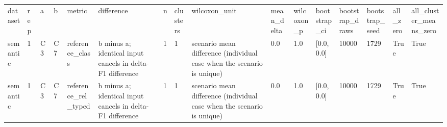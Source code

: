 \begin{tabular}{llllllllllllllll}
dataset & rep & a & b & metric & difference & n & clusters & wilcoxon\_unit & mean\_delta & wilcoxon\_p & bootstrap\_ci & bootstrap\_draws & bootstrap\_seed & all\_zero & all\_cluster\_means\_zero \\
semantic & 1 & C3 & C7 & reference\_class & b minus a; identical input cancels in delta-F1 difference & 1 & 1 & scenario mean difference (individual case when the scenario is unique) & 0.0 & 1.0 & [0.0, 0.0] & 10000 & 1729 & True & True \\
semantic & 1 & C3 & C7 & reference\_rel\_typed & b minus a; identical input cancels in delta-F1 difference & 1 & 1 & scenario mean difference (individual case when the scenario is unique) & 0.0 & 1.0 & [0.0, 0.0] & 10000 & 1729 & True & True \\
\end{tabular}